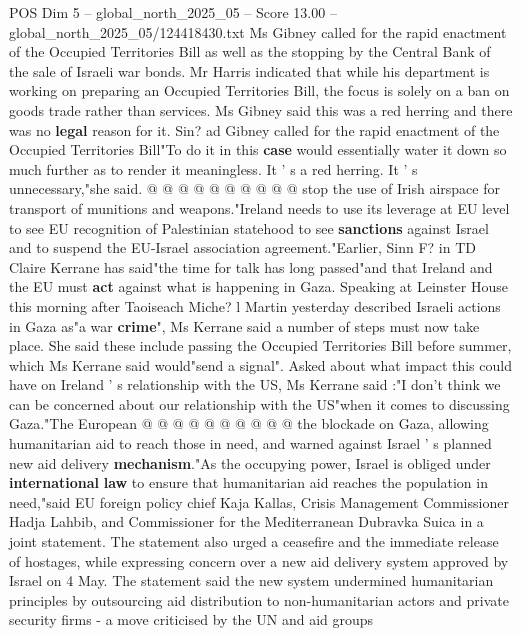 \begin{textsample}{POS Dim 5 – global\_north\_2025\_05 – Score 13.00 – global\_north\_2025\_05/124418430.txt}
Ms Gibney called for the rapid enactment of the Occupied Territories Bill as well as the stopping by the Central Bank of the sale of Israeli war bonds.
Mr Harris indicated that while his department is working on preparing an Occupied Territories Bill, the focus is solely on a ban on goods trade rather than services.
Ms Gibney said this was a red herring and there was no \textbf{legal} reason for it.
Sin? ad Gibney called for the rapid enactment of the Occupied Territories Bill"To do it in this \textbf{case} would essentially water it down so much further as to render it meaningless.
It ' s a red herring.
It ' s unnecessary,"she said. @ @ @ @ @ @ @ @ @ @ stop the use of Irish airspace for transport of munitions and weapons."Ireland needs to use its leverage at EU level to see EU recognition of Palestinian statehood to see \textbf{sanctions} against Israel and to suspend the EU-Israel association agreement."Earlier, Sinn F? in TD Claire Kerrane has said"the time for talk has long passed"and that Ireland and the EU must \textbf{act} against what is happening in Gaza.
Speaking at Leinster House this morning after Taoiseach Miche? l Martin yesterday described Israeli actions in Gaza as"a war \textbf{crime}", Ms Kerrane said a number of steps must now take place.
She said these include passing the Occupied Territories Bill before summer, which Ms Kerrane said would"send a signal".
Asked about what impact this could have on Ireland ' s relationship with the US, Ms Kerrane said :"I don't think we can be concerned about our relationship with the US"when it comes to discussing Gaza."The European @ @ @ @ @ @ @ @ @ @ the blockade on Gaza, allowing humanitarian aid to reach those in need, and warned against Israel ' s planned new aid delivery \textbf{mechanism}."As the occupying power, Israel is obliged under \textbf{international} \textbf{law} to ensure that humanitarian aid reaches the population in need,"said EU foreign policy chief Kaja Kallas, Crisis Management Commissioner Hadja Lahbib, and Commissioner for the Mediterranean Dubravka Suica in a joint statement.
The statement also urged a ceasefire and the immediate release of hostages, while expressing concern over a new aid delivery system approved by Israel on 4 May.
The statement said the new system undermined humanitarian principles by outsourcing aid distribution to non-humanitarian actors and private security firms - a move criticised by the UN and aid groups

\end{textsample}
